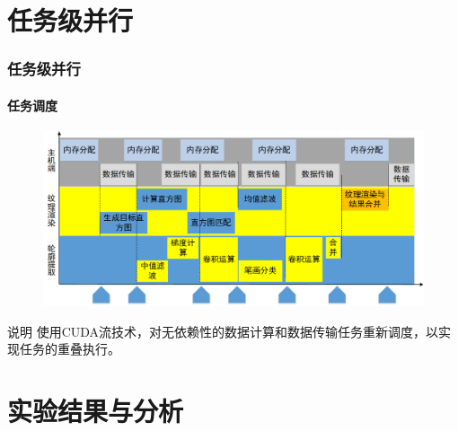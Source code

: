 \documentclass[aspectratio=43, xcolor=svgnames, t, 10pt]{beamer}
\begin{document}
\section{任务级并行}
\begin{frame}
  \frametitle{任务级并行}
  \framesubtitle{任务调度}
  \begin{figure}
    \includegraphics[width=\linewidth]{./figure/task_schedule.png}
  \end{figure}
  \begin{block}{说明}
    使用CUDA流技术，对无依赖性的数据计算和数据传输任务重新调度，以实现任务的重叠执行。
  \end{block}
\end{frame}


\section{实验结果与分析}
\end{document}
